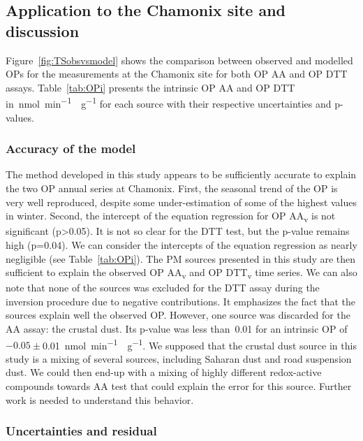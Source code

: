 \documentclass[acp, manuscript]{copernicus}
\begin{document}
\subsection{Application to the Chamonix site and
discussion}\label{application-to-the-chamonix-site-and-discussion}

Figure~\ref{fig:TSobsvsmodel} shows the comparison between observed and modelled OPs for the
measurements at the Chamonix site for both OP AA and OP DTT assays.
Table~\ref{tab:OPi} presents the intrinsic OP AA and OP DTT in~\unit{nmol~min^{-1}~\mu g^{-1}} for each
source with their respective uncertainties and p-values.

\subsubsection{Accuracy of the model}\label{accuracy-of-the-model}

The method developed in this study appears to be sufficiently accurate
to explain the two OP annual series at Chamonix. First, the seasonal
trend of the OP is very well reproduced, despite some under-estimation
of some of the highest values in winter. Second, the intercept of the
equation regression for OP AA\textsubscript{v} is not significant
(p\textgreater{}0.05). It is not so clear for the DTT test, but the
p-value remains high (p=0.04). We can consider the intercepts of the
equation regression as nearly negligible (see Table~\ref{tab:OPi}). The PM sources
presented in this study are then sufficient to explain the observed OP
AA\textsubscript{v} and OP DTT\textsubscript{v} time series. We can also
note that none of the sources was excluded for the DTT assay during the
inversion procedure due to negative contributions. It emphasizes the
fact that the sources explain well the observed OP. However, one source
was discarded for the AA assay: the crustal dust. Its p-value was less
than~0.01 for an intrinsic OP of $-0.05\pm$0.01~\unit{nmol~min^{-1}~\mu g^{-1}}. We supposed that the
crustal dust source in this study is a mixing of several sources,
including Saharan dust and road suspension dust. We could then end-up
with a mixing of highly different redox-active compounds towards AA test
that could explain the error for this source. Further work is needed to
understand this behavior.

\subsubsection{Uncertainties and residual}\label{uncertainties-and-residual}
\end{document}

